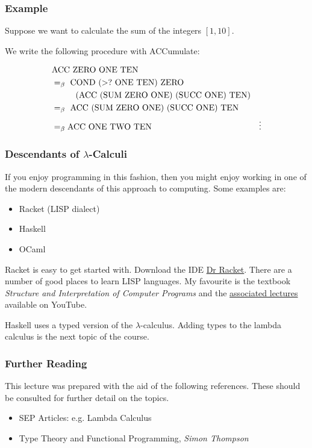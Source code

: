 \documentclass{beamer}
\begin{document}
\begin{frame}
	\frametitle{Example}
	
	Suppose we want to calculate the sum of the integers $[1,10]$. 
	
	We write the following procedure with ACCumulate: 

	\begin{align*}
		&\ACC \ \ZERO \ \ONE \ \text{TEN} \\
		&\beq \ \COND \ (>? \ \ONE \ \text{TEN}) \ \ZERO \\ 
		&\hspace{1cm} (\ACC \ (\SUM \ \ZERO \ \ONE) \ (\SUCC \ \ONE) \ \text{TEN}) \\
		&\beq \ \ACC \ (\SUM \ \ZERO \ \ONE) \ (\SUCC \ \ONE) \ \text{TEN} \\
		&\beq \ACC \ \ONE \ \TWO \ \text{TEN}
		&\vdots
	\end{align*}


\end{frame}

\begin{frame}
	\frametitle{Descendants of $\lambda$-Calculi}

	If you enjoy programming in this fashion, then you might enjoy working in one of the modern descendants of this approach to computing. Some examples are: 

	\begin{itemize}
		\item Racket (LISP dialect)
		\item Haskell
		\item OCaml
	\end{itemize}

	Racket is easy to get started with. Download the IDE \href{https://racket-lang.org/download/}{Dr Racket}. There are a number of good places to learn LISP languages. My favourite is the textbook \emph{Structure and Interpretation of Computer Programs} and the \href{https://www.youtube.com/playlist?list=PLE18841CABEA24090}{associated lectures} available on YouTube. 

	Haskell uses a typed version of the $\lambda$-calculus. Adding types to the lambda calculus is the next topic of the course. 

\end{frame}

\begin{frame}
	\frametitle{Further Reading}
	
    This lecture was prepared with the aid of the following references. 
    These should be consulted for further detail on the topics. 

    \begin{itemize}
		\item SEP Articles: e.g. Lambda Calculus
		\item Type Theory and Functional Programming, \emph{Simon Thompson}
	\end{itemize}

	\printbibliography
	
\end{frame}
\end{document}
